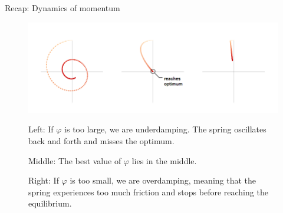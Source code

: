 \documentclass[11pt,compress,t,notes=noshow, xcolor=table]{beamer}
\begin{document}
\begin{vbframe}{Recap: Dynamics of momentum}
\framebreak

\begin{figure}
	\includegraphics[height=0.35\textwidth, keepaspectratio]{figure_man/momentum_damping.png} 
	\begin{footnotesize}
		 
		Left: If $\varphi$ is too large, we are underdamping. The spring oscillates back and forth and misses the optimum. 
		
		Middle: The best value of $\varphi$ lies in the middle. 
		
		Right: If $\varphi$ is too small, we are overdamping, meaning that the spring experiences too much friction and stops before reaching the equilibrium. 
	\end{footnotesize}
\end{figure}

\end{vbframe}


\endlecture
\end{document}
